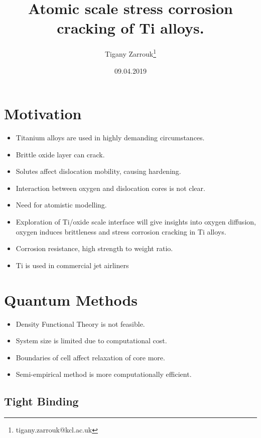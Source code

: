 \documentclass[11pt]{article}
\author{Tigany Zarrouk\thanks{tigany.zarrouk@kcl.ac.uk}}
\date{09.04.2019}
\title{Atomic scale stress corrosion cracking of Ti alloys.}
\begin{document}
\maketitle


\section*{Motivation}
\label{sec:org792ceb1}
\begin{itemize}
\item Titanium alloys are used in highly demanding circumstances.
\item Brittle oxide layer can crack.
\item Solutes affect dislocation mobility, causing hardening.
\item Interaction between oxygen and dislocation cores is not clear.
\item Need for atomistic modelling.
\item Exploration of Ti/oxide scale interface will give insights into oxygen
diffusion, oxygen induces brittleness and stress corrosion cracking in Ti
alloys.
\end{itemize}
\begin{NOTES}
\begin{itemize}
\item Corrosion resistance, high strength to weight ratio.
\item Ti is used in commercial jet airliners
\end{itemize}
\end{NOTES}


\section*{Quantum Methods}
\label{sec:orgc1f9e9c}
\begin{itemize}
\item Density Functional Theory is not feasible.
\item System size is limited due to computational cost.
\item Boundaries of cell affect relaxation of core more.
\item Semi-empirical method is more computationally efficient.
\end{itemize}

\subsection*{Tight Binding}
\label{sec:org8cd49e8}
\end{document}
